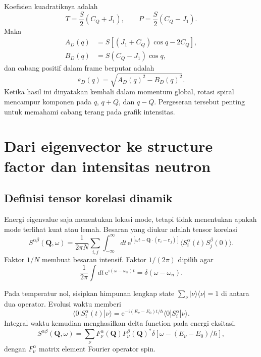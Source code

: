 \documentclass[11pt,a4paper]{article}
\newcommand{\ii}{\mathrm{i}}
\newcommand{\ee}{\mathrm{e}}
\newcommand{\vQ}{\bm Q}
\begin{document}
Koefisien kuadratiknya adalah
\begin{equation}
T=\frac S2(C_Q+J_1),
\qquad
P=\frac S2(C_Q-J_1).
\end{equation}
Maka
\begin{align}
A_D(q)&=S[(J_1+C_Q)\cos q-2C_Q],\\
B_D(q)&=S(C_Q-J_1)\cos q,
\end{align}
dan cabang positif dalam frame berputar adalah
\begin{equation}
\boxed{\varepsilon_D(q)=\sqrt{A_D(q)^2-B_D(q)^2}.}
\label{eq:j1d-dispersion}
\end{equation}
Ketika hasil ini dinyatakan kembali dalam momentum global, rotasi spiral mencampur komponen pada $q$, $q+Q$, dan $q-Q$. Pergeseran tersebut penting untuk memahami cabang terang pada grafik intensitas.

\section{Dari eigenvector ke structure factor dan intensitas neutron}

\subsection{Definisi tensor korelasi dinamik}

Energi eigenvalue saja menentukan lokasi mode, tetapi tidak menentukan apakah mode terlihat kuat atau lemah. Besaran yang diukur adalah tensor korelasi
\begin{equation}
S^{\alpha\beta}(\vQ,\omega)
=\frac{1}{2\pi N}
\sum_{i,j}\int_{-\infty}^{\infty}dt\,
\ee^{\ii[\omega t-\vQ\cdot(\bm r_i-\bm r_j)]}
\langle S_i^\alpha(t)S_j^\beta(0)\rangle.
\label{eq:dynamic-structure-factor}
\end{equation}
Faktor $1/N$ membuat besaran intensif. Faktor $1/(2\pi)$ dipilih agar
\begin{equation}
\frac1{2\pi}\int dt\,\ee^{\ii(\omega-\omega_n)t}
=\delta(\omega-\omega_n).
\end{equation}

Pada temperatur nol, sisipkan himpunan lengkap state $\sum_\nu|\nu\rangle\langle\nu|=1$ di antara dua operator. Evolusi waktu memberi
\begin{equation}
\langle0|S_i^\alpha(t)|\nu\rangle
=\ee^{-\ii(E_\nu-E_0)t/\hbar}
\langle0|S_i^\alpha|\nu\rangle.
\end{equation}
Integral waktu kemudian menghasilkan delta function pada energi eksitasi,
\begin{equation}
S^{\alpha\beta}(\vQ,\omega)
=\sum_\nu
F_\nu^\alpha(\vQ)
F_\nu^{\beta}(\vQ)^*
\delta[\omega-(E_\nu-E_0)/\hbar],
\label{eq:spectral-representation}
\end{equation}
dengan $F_\nu^\alpha$ matrix element Fourier operator spin.
\end{document}
